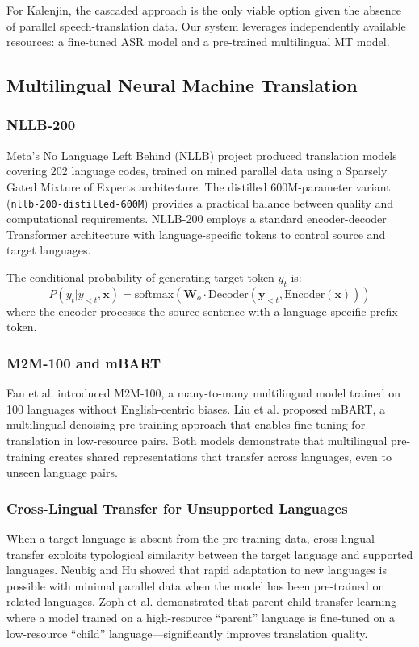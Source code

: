 \documentclass[conference]{IEEEtran}
\begin{document}
For Kalenjin, the cascaded approach is the only viable option given the absence of parallel speech-translation data. Our system leverages independently available resources: a fine-tuned ASR model and a pre-trained multilingual MT model.

\subsection{Multilingual Neural Machine Translation}

\subsubsection{NLLB-200}
Meta's No Language Left Behind (NLLB) project \cite{nllb2022} produced translation models covering 202 language codes, trained on mined parallel data using a Sparsely Gated Mixture of Experts architecture. The distilled 600M-parameter variant (\texttt{nllb-200-distilled-600M}) provides a practical balance between quality and computational requirements. NLLB-200 employs a standard encoder-decoder Transformer architecture \cite{vaswani2017attention} with language-specific tokens to control source and target languages.

The conditional probability of generating target token $y_t$ is:
\begin{equation}
P(y_t | y_{<t}, \mathbf{x}) = \text{softmax}(\mathbf{W}_o \cdot \text{Decoder}(\mathbf{y}_{<t}, \text{Encoder}(\mathbf{x})))
\label{eq:nllb}
\end{equation}
where the encoder processes the source sentence with a language-specific prefix token.

\subsubsection{M2M-100 and mBART}
Fan et al. \cite{fan2021m2m} introduced M2M-100, a many-to-many multilingual model trained on 100 languages without English-centric biases. Liu et al. \cite{liu2020multilingual} proposed mBART, a multilingual denoising pre-training approach that enables fine-tuning for translation in low-resource pairs. Both models demonstrate that multilingual pre-training creates shared representations that transfer across languages, even to unseen language pairs.

\subsubsection{Cross-Lingual Transfer for Unsupported Languages}
When a target language is absent from the pre-training data, cross-lingual transfer exploits typological similarity between the target language and supported languages. Neubig and Hu \cite{neubig2018rapid} showed that rapid adaptation to new languages is possible with minimal parallel data when the model has been pre-trained on related languages. Zoph et al. \cite{zoph2016transfer} demonstrated that parent-child transfer learning---where a model trained on a high-resource ``parent'' language is fine-tuned on a low-resource ``child'' language---significantly improves translation quality.
\end{document}
